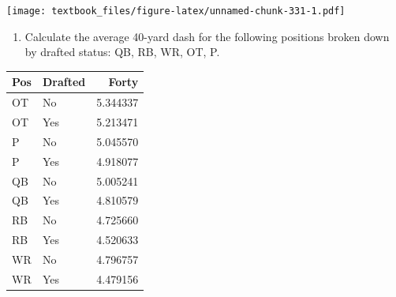 \documentclass[
  11pt,
]{book}
\newenvironment{Shaded}{\begin{snugshade}}{\end{snugshade}}
\newcommand{\AttributeTok}[1]{\textcolor[rgb]{0.77,0.63,0.00}{#1}}
\newcommand{\ConstantTok}[1]{\textcolor[rgb]{0.00,0.00,0.00}{#1}}
\newcommand{\FunctionTok}[1]{\textcolor[rgb]{0.00,0.00,0.00}{#1}}
\newcommand{\NormalTok}[1]{#1}
\newcommand{\OtherTok}[1]{\textcolor[rgb]{0.56,0.35,0.01}{#1}}
\newcommand{\SpecialCharTok}[1]{\textcolor[rgb]{0.00,0.00,0.00}{#1}}
\newcommand{\StringTok}[1]{\textcolor[rgb]{0.31,0.60,0.02}{#1}}
\providecommand{\tightlist}{%
  \setlength{\itemsep}{0pt}\setlength{\parskip}{0pt}}
\theoremstyle{definition}
\theoremstyle{definition}
\theoremstyle{definition}
\theoremstyle{definition}
\theoremstyle{remark}
\begin{document}
\texttt{[image: textbook\_files/figure-latex/unnamed-chunk-331-1.pdf]}

\newpage

\begin{enumerate}
\def\labelenumi{(\alph{enumi})}
\setcounter{enumi}{4}
\tightlist
\item
  Calculate the average 40-yard dash for the following positions broken down by drafted status: QB, RB, WR, OT, P.
\end{enumerate}

\begin{Shaded}
\end{Shaded}

\begin{tabular}{llr}
\toprule
Pos & Drafted & Forty\\
\midrule
OT & No & 5.344337\\
OT & Yes & 5.213471\\
P & No & 5.045570\\
P & Yes & 4.918077\\
QB & No & 5.005241\\
QB & Yes & 4.810579\\
RB & No & 4.725660\\
RB & Yes & 4.520633\\
WR & No & 4.796757\\
WR & Yes & 4.479156\\
\bottomrule
\end{tabular}
\end{document}
